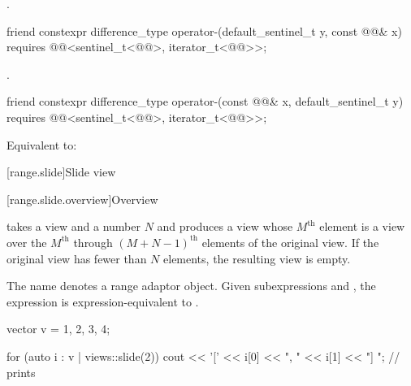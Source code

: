 \begin{itemdescr}
\pnum
\returns
{}.
\end{itemdescr}

%
\begin{itemdecl}
friend constexpr difference_type operator-(default_sentinel_t y, const @@& x)
  requires @@<sentinel_t<@@>, iterator_t<@@>>;
\end{itemdecl}

\begin{itemdescr}
\pnum
\returns
{}.
\end{itemdescr}

%
\begin{itemdecl}
friend constexpr difference_type operator-(const @@& x, default_sentinel_t y)
  requires @@<sentinel_t<@@>, iterator_t<@@>>;
\end{itemdecl}

\begin{itemdescr}
\pnum
\effects
Equivalent to: 
\end{itemdescr}

[range.slide]{Slide view}

[range.slide.overview]{Overview}

\pnum
{} takes a view and a number $N$ and
produces a view
whose $M^\text{th}$ element is a view over
the $M^\text{th}$ through
$(M + N - 1)^\text{th}$ elements
of the original view.
If the original view has fewer than $N$ elements,
the resulting view is empty.

\pnum
{}%
The name  denotes
a range adaptor object.
Given subexpressions  and ,
the expression  is expression-equivalent to
.
\begin{example}
\begin{codeblock}
vector v = {1, 2, 3, 4};

for (auto i : v | views::slide(2)) {
  cout << '[' << i[0] << ", " << i[1] << "] ";          // prints \tcode{[1, 2] [2, 3] [3, 4]}
}
\end{codeblock}
\end{example}

